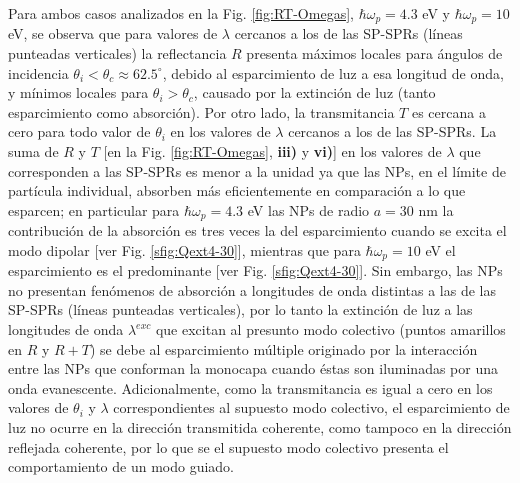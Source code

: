 Para ambos casos analizados en la Fig. \ref{fig:RT-Omegas}, $\hbar\omega_p = 4.3$ eV y $\hbar\omega_p = 10$ eV, se observa que para valores de $\lambda$ cercanos a los de las SP-SPRs (líneas punteadas verticales) la reflectancia $R$ presenta máximos locales para ángulos de incidencia $\theta_i<\theta_c \approx 62.5^\circ$, debido al esparcimiento de luz a esa longitud de onda, y mínimos locales para $\theta_i>\theta_c$, causado por la extinción de luz (tanto esparcimiento como absorción). Por otro lado, la transmitancia $T$ es cercana a cero para todo valor de $\theta_i$ en los valores de $\lambda$ cercanos a los de las SP-SPRs. La suma de $R$ y $T$ [en la Fig. \ref{fig:RT-Omegas}, \textbf{iii)} y \textbf{vi)}] en los valores de $\lambda$ que corresponden a las SP-SPRs es menor a la unidad ya que las NPs, en el límite de partícula individual, absorben más eficientemente en comparación a lo que esparcen; en particular para $\hbar\omega_p=4.3$ eV las NPs de radio $a= 30$ nm la contribución de la absorción es tres veces la del esparcimiento cuando se excita el modo dipolar [ver Fig. \ref{sfig:Qext4-30}], mientras que para $\hbar\omega_p = 10$ eV el esparcimiento es el predominante [ver Fig. \ref{sfig:Qext4-30}]. Sin embargo, las NPs no presentan fenómenos de absorción a longitudes de onda distintas a las de las SP-SPRs (líneas punteadas verticales), por lo tanto la extinción de luz a las longitudes de onda $\lambda^{exc}$ que excitan al presunto modo colectivo (puntos amarillos en $R$ y $R+T$) se debe al esparcimiento múltiple originado por la interacción entre las NPs que conforman la monocapa cuando éstas son iluminadas por una onda evanescente. Adicionalmente, como la transmitancia es igual a cero en los valores de $\theta_i$ y $\lambda$ correspondientes al supuesto modo colectivo, el esparcimiento de luz no ocurre en la dirección transmitida coherente, como tampoco en la dirección reflejada coherente, por lo que se el supuesto modo colectivo presenta el comportamiento de un modo guiado.

